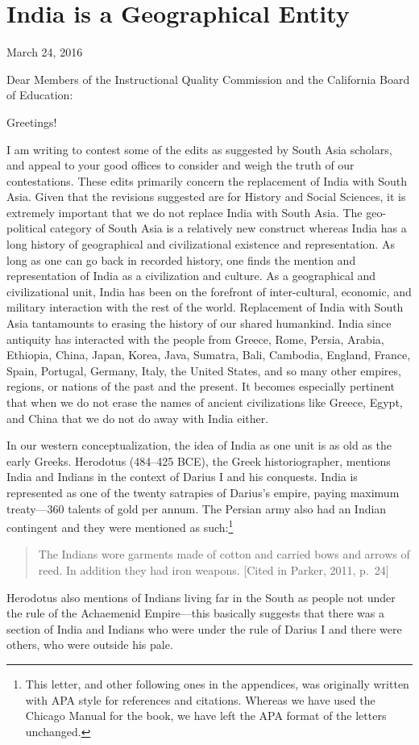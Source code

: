 \chapter{India is a Geographical Entity}

March 24, 2016
\vskip 2pt

Dear Members of the Instructional Quality Commission and the California Board of Education:
\vskip 2pt

Greetings!
\vskip 2pt

I am writing to contest some of the edits as suggested by South Asia scholars, and appeal to your good offices to consider and weigh the truth of our contestations. These edits primarily concern the replacement of India with South Asia. Given that the revisions suggested are for History and Social Sciences, it is extremely important that we do not replace India with South Asia. The geo-political category of South Asia is a relatively new construct whereas India has a long history of geographical and civilizational existence and representation. As long as one can go back in recorded history, one finds the mention and representation of India as a civilization and culture. As a geographical and civilizational unit, India has been on the forefront of inter-cultural, economic, and military interaction with the rest of the world. Replacement of India with South Asia tantamounts to erasing the history of our shared humankind. India since antiquity has interacted with the people from Greece, Rome, Persia, Arabia, Ethiopia, China, Japan, Korea, Java, Sumatra, Bali, Cambodia, England, France, Spain, Portugal, Germany, Italy, the United States, and so many other empires, regions, or nations of the past and the present. It becomes especially pertinent that when we do not erase the names of ancient civilizations like Greece, Egypt, and China that we do not do away with India either.

In our western conceptualization, the idea of India as one unit is as old as the early Greeks. Herodotus (484--425 BCE), the Greek historiographer, mentions India and Indians in the context of Darius I and his conquests. India is represented as one of the twenty satrapies of Darius’s empire, paying maximum treaty—360 talents of gold per annum. The Persian army also had an Indian contingent and they were mentioned as such:\footnote{This letter, and other following ones in the appendices, was originally written with APA style for references and citations. Whereas we have used the Chicago Manual for the book, we have left the APA format of the letters unchanged.}
\begin{quote}
The Indians wore garments made of cotton and carried bows and arrows of reed. In addition they had iron weapons. [Cited in Parker, 2011, p.\ 24]
\end{quote}
Herodotus also mentions of Indians living far in the South as people not under the rule of the Achaemenid Empire—this basically suggests that there was a section of India and Indians who were under the rule of Darius I and there were others, who were outside his pale.

